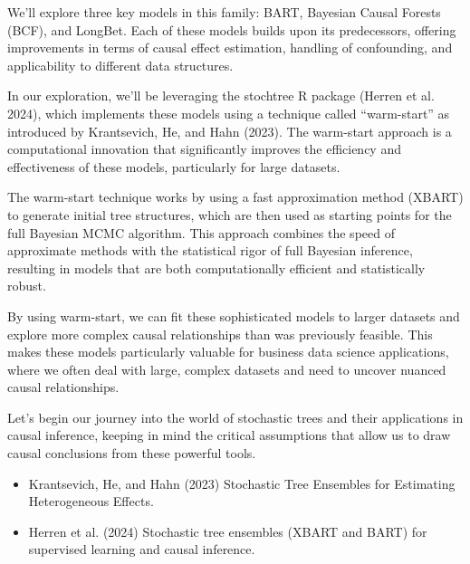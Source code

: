 \documentclass[
  letterpaper,
  DIV=11,
  numbers=noendperiod]{scrreprt}
\providecommand{\tightlist}{%
  \setlength{\itemsep}{0pt}\setlength{\parskip}{0pt}}\usepackage{longtable,booktabs,array}
\begin{document}
We'll explore three key models in this family: BART, Bayesian Causal
Forests (BCF), and LongBet. Each of these models builds upon its
predecessors, offering improvements in terms of causal effect
estimation, handling of confounding, and applicability to different data
structures.

In our exploration, we'll be leveraging the stochtree R package (Herren
et al. 2024), which implements these models using a technique called
``warm-start'' as introduced by Krantsevich, He, and Hahn (2023). The
warm-start approach is a computational innovation that significantly
improves the efficiency and effectiveness of these models, particularly
for large datasets.

The warm-start technique works by using a fast approximation method
(XBART) to generate initial tree structures, which are then used as
starting points for the full Bayesian MCMC algorithm. This approach
combines the speed of approximate methods with the statistical rigor of
full Bayesian inference, resulting in models that are both
computationally efficient and statistically robust.

By using warm-start, we can fit these sophisticated models to larger
datasets and explore more complex causal relationships than was
previously feasible. This makes these models particularly valuable for
business data science applications, where we often deal with large,
complex datasets and need to uncover nuanced causal relationships.

Let's begin our journey into the world of stochastic trees and their
applications in causal inference, keeping in mind the critical
assumptions that allow us to draw causal conclusions from these powerful
tools.

\begin{tcolorbox}[enhanced jigsaw, colframe=quarto-callout-tip-color-frame, left=2mm, toprule=.15mm, colbacktitle=quarto-callout-tip-color!10!white, title=\textcolor{quarto-callout-tip-color}{\faLightbulb}\hspace{0.5em}{Learn more}, coltitle=black, rightrule=.15mm, leftrule=.75mm, colback=white, arc=.35mm, bottomtitle=1mm, bottomrule=.15mm, breakable, titlerule=0mm, opacitybacktitle=0.6, toptitle=1mm, opacityback=0]

\begin{itemize}
\tightlist
\item
  Krantsevich, He, and Hahn (2023) Stochastic Tree Ensembles for
  Estimating Heterogeneous Effects.
\item
  Herren et al. (2024) Stochastic tree ensembles (XBART and BART) for
  supervised learning and causal inference.
\end{itemize}

\end{tcolorbox}
\end{document}
